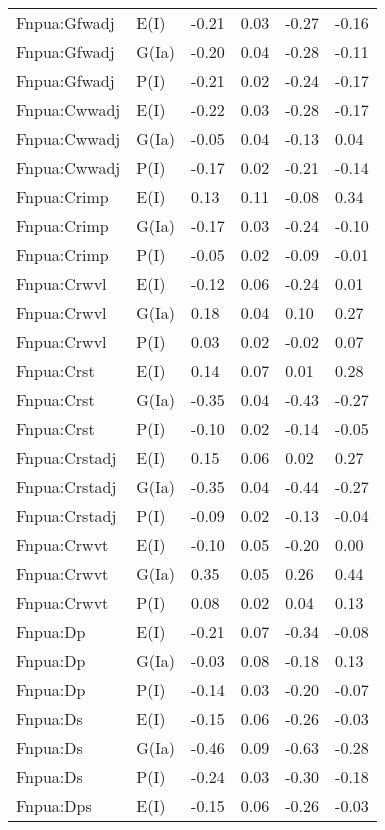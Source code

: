 \begin{center}
\begin{longtable}{|p{1.1in}|p{0.7in}|p{0.7in}|p{0.6in}|p{0.6in}|p{0.6in}|}
  Fnpua:Gfwadj & E(I) & -0.21 & 0.03 & -0.27 & -0.16 \\ 
  Fnpua:Gfwadj & G(Ia) & -0.20 & 0.04 & -0.28 & -0.11 \\ 
  Fnpua:Gfwadj & P(I) & -0.21 & 0.02 & -0.24 & -0.17 \\ 
  Fnpua:Cwwadj & E(I) & -0.22 & 0.03 & -0.28 & -0.17 \\ 
  Fnpua:Cwwadj & G(Ia) & -0.05 & 0.04 & -0.13 & 0.04 \\ 
  Fnpua:Cwwadj & P(I) & -0.17 & 0.02 & -0.21 & -0.14 \\ 
  Fnpua:Crimp & E(I) & 0.13 & 0.11 & -0.08 & 0.34 \\ 
  Fnpua:Crimp & G(Ia) & -0.17 & 0.03 & -0.24 & -0.10 \\ 
  Fnpua:Crimp & P(I) & -0.05 & 0.02 & -0.09 & -0.01 \\ 
  Fnpua:Crwvl & E(I) & -0.12 & 0.06 & -0.24 & 0.01 \\ 
  Fnpua:Crwvl & G(Ia) & 0.18 & 0.04 & 0.10 & 0.27 \\ 
  Fnpua:Crwvl & P(I) & 0.03 & 0.02 & -0.02 & 0.07 \\ 
  Fnpua:Crst & E(I) & 0.14 & 0.07 & 0.01 & 0.28 \\ 
  Fnpua:Crst & G(Ia) & -0.35 & 0.04 & -0.43 & -0.27 \\ 
  Fnpua:Crst & P(I) & -0.10 & 0.02 & -0.14 & -0.05 \\ 
  Fnpua:Crstadj & E(I) & 0.15 & 0.06 & 0.02 & 0.27 \\ 
  Fnpua:Crstadj & G(Ia) & -0.35 & 0.04 & -0.44 & -0.27 \\ 
  Fnpua:Crstadj & P(I) & -0.09 & 0.02 & -0.13 & -0.04 \\ 
  Fnpua:Crwvt & E(I) & -0.10 & 0.05 & -0.20 & 0.00 \\ 
  Fnpua:Crwvt & G(Ia) & 0.35 & 0.05 & 0.26 & 0.44 \\ 
  Fnpua:Crwvt & P(I) & 0.08 & 0.02 & 0.04 & 0.13 \\ 
  Fnpua:Dp & E(I) & -0.21 & 0.07 & -0.34 & -0.08 \\ 
  Fnpua:Dp & G(Ia) & -0.03 & 0.08 & -0.18 & 0.13 \\ 
  Fnpua:Dp & P(I) & -0.14 & 0.03 & -0.20 & -0.07 \\ 
  Fnpua:Ds & E(I) & -0.15 & 0.06 & -0.26 & -0.03 \\ 
  Fnpua:Ds & G(Ia) & -0.46 & 0.09 & -0.63 & -0.28 \\ 
  Fnpua:Ds & P(I) & -0.24 & 0.03 & -0.30 & -0.18 \\ 
  Fnpua:Dps & E(I) & -0.15 & 0.06 & -0.26 & -0.03 \\ 

\end{longtable}
\end{center}
